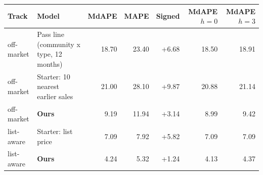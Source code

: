 \begin{tabular}{llrrrrr}
\toprule
Track & Model & MdAPE & MAPE & Signed & MdAPE $h{=}0$ & MdAPE $h{=}3$ \\
\midrule
off-market & Pass line (community x type, 12 months) & 18.70 & 23.40 & +6.68 & 18.50 & 18.91 \\
off-market & Starter: 10 nearest earlier sales & 21.00 & 28.10 & +9.87 & 20.88 & 21.14 \\
off-market & \textbf{Ours} & 9.19 & 11.94 & +3.14 & 8.99 & 9.42 \\
\midrule
list-aware & Starter: list price & 7.09 & 7.92 & +5.82 & 7.09 & 7.09 \\
list-aware & \textbf{Ours} & 4.24 & 5.32 & +1.24 & 4.13 & 4.37 \\
\bottomrule
\end{tabular}
